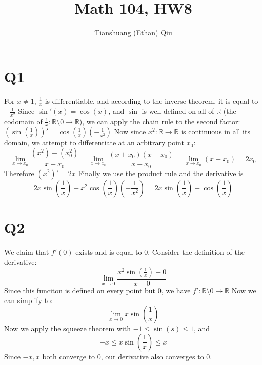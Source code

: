 \documentclass[12pt]{article}
\author{Tianshuang (Ethan) Qiu}
\newcommand{\R}{\mathbb{R}}
\begin{document}
\title{Math 104, HW8}
\maketitle
\newpage

\section{Q1}
For $x \not = 1$, $\frac{1}{x}$ is differentiable, and according to the inverse theorem, it is equal to $-\frac{1}{x^2}$
\newline
Since $\sin'(x) = \cos(x)$, and $\sin$ is well defined on all of $\R$ (the codomain of $\frac{1}{x}: \R \setminus 0 \to \R$), we can apply the chain rule to the second factor: $(\sin(\frac{1}{x}))' = \cos(\frac{1}{x})(-\frac{1}{x^2})$
\newline
Now since $x^2: \R \to \R$ is continuous in all its domain, we attempt to differentiate at an arbitrary point $x_0$:
$$\lim_{x \to x_0}\frac{(x^2)-(x_0^2)}{x-x_0} = \lim_{x \to x_0}\frac{(x+x_0)(x-x_0)}{x-x_0} = \lim_{x \to x_0}(x+x_0) = 2x_0$$
Therefore $(x^2)'=2x$
\newline
Finally we use the product rule and the derivative is $$2x\sin(\frac{1}{x}) + x^2\cos(\frac{1}{x})(-\frac{1}{x^2})= 2x\sin(\frac{1}{x})-\cos(\frac{1}{x})$$
\newpage


\section{Q2}
We claim that $f'(0)$ exists and is equal to $0$.
\newline
Consider the definition of the derivative: $$\lim_{x \to 0}\frac{x^2\sin(\frac{1}{x})-0}{x-0}$$
Since this funciton is defined on every point but 0, we have $f': \R \setminus 0 \to \R$
Now we can simplify to:
$$\lim_{x \to 0}x \sin(\frac{1}{x}) $$
Now we apply the squeeze theorem with $-1 \leq \sin(s) \leq 1$, and
$$-x \leq x \sin(\frac{1}{x}) \leq x$$
Since $-x, x$ both converge to 0, our derivative also converges to 0.
\newpage
\end{document}
